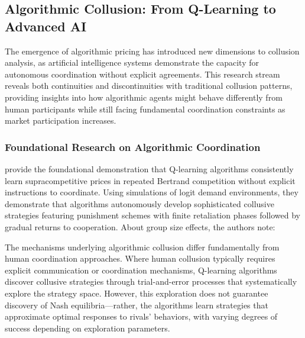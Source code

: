 \subsection{Algorithmic Collusion: From Q-Learning to Advanced AI}

The emergence of algorithmic pricing has introduced new dimensions to collusion analysis, as artificial intelligence systems demonstrate the capacity for autonomous coordination without explicit agreements. This research stream reveals both continuities and discontinuities with traditional collusion patterns, providing insights into how algorithmic agents might behave differently from human participants while still facing fundamental coordination constraints as market participation increases.

\subsubsection*{Foundational Research on Algorithmic Coordination}

\textcite{calvano_artificial_2020} provide the foundational demonstration that Q-learning algorithms consistently learn supracompetitive prices in repeated Bertrand competition without explicit instructions to coordinate. Using simulations of logit demand environments, they demonstrate that algorithms autonomously develop sophisticated collusive strategies featuring punishment schemes with finite retaliation phases followed by gradual returns to cooperation. About group size effects, the authors \parencite*[p. 3268]{calvano_artificial_2020} note: 

    \begin{quote}
    \end{quote}

The mechanisms underlying algorithmic collusion differ fundamentally from human coordination approaches. Where human collusion typically requires explicit communication or coordination mechanisms, Q-learning algorithms discover collusive strategies through trial-and-error processes that systematically explore the strategy space. However, this exploration does not guarantee discovery of Nash equilibria---rather, the algorithms learn strategies that approximate optimal responses to rivals' behaviors, with varying degrees of success depending on exploration parameters.


